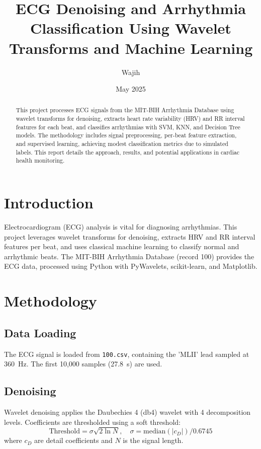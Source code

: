 \documentclass[a4paper,11pt]{article}
\title{ECG Denoising and Arrhythmia Classification Using Wavelet Transforms and Machine Learning}
\author{Wajih}
\date{May 2025}
\begin{document}
\maketitle

\begin{abstract}
This project processes ECG signals from the MIT-BIH Arrhythmia Database using wavelet transforms for denoising, extracts heart rate variability (HRV) and RR interval features for each beat, and classifies arrhythmias with SVM, KNN, and Decision Tree models. The methodology includes signal preprocessing, per-beat feature extraction, and supervised learning, achieving modest classification metrics due to simulated labels. This report details the approach, results, and potential applications in cardiac health monitoring.
\end{abstract}

\section{Introduction}
Electrocardiogram (ECG) analysis is vital for diagnosing arrhythmias. This project leverages wavelet transforms for denoising, extracts HRV and RR interval features per beat, and uses classical machine learning to classify normal and arrhythmic beats. The MIT-BIH Arrhythmia Database (record 100) provides the ECG data, processed using Python with PyWavelets, scikit-learn, and Matplotlib.

\section{Methodology}

\subsection{Data Loading}
The ECG signal is loaded from \texttt{100.csv}, containing the 'MLII' lead sampled at \SI{360}{\hertz}. The first 10,000 samples (\SI{27.8}{\second}) are used.

\subsection{Denoising}
Wavelet denoising applies the Daubechies 4 (db4) wavelet with 4 decomposition levels. Coefficients are thresholded using a soft threshold:
\[
\text{Threshold} = \sigma \sqrt{2 \ln N}, \quad \sigma = \text{median}(|c_D|)/0.6745
\]
where \( c_D \) are detail coefficients and \( N \) is the signal length.
\end{document}
